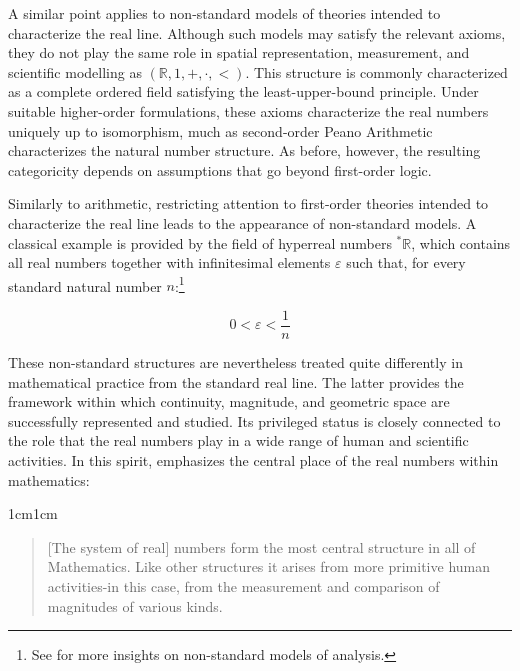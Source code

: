 \documentclass[11pt,a4paper]{book}
\theoremstyle{plain}
\begin{document}
A similar point applies to non-standard models of theories intended to characterize the real line. Although such models may satisfy the relevant axioms, they do not play the same role in spatial representation, measurement, and scientific modelling as $(\mathbb{R},1, +, \cdot, <)$. This structure is commonly characterized as a complete ordered field satisfying the least-upper-bound principle. Under suitable higher-order formulations, these axioms characterize the real numbers uniquely up to isomorphism, much as second-order Peano Arithmetic characterizes the natural number structure. As before, however, the resulting categoricity depends on assumptions that go beyond first-order logic.

Similarly to arithmetic, restricting attention to first-order theories intended to characterize the real line leads to the appearance of non-standard models. A classical example is provided by the field of hyperreal numbers $^*\mathbb{R}$, which contains all real numbers together with infinitesimal elements $\varepsilon$ such that, for every standard natural number $n$:\footnote{See \textcite{robinson1966nonstandard} for more insights on non-standard models of analysis.}

$$ 0 < \varepsilon < \frac{1}{n} $$

These non-standard structures are nevertheless treated quite differently in mathematical practice from the standard real line. The latter provides the framework within which continuity, magnitude, and geometric space are successfully represented and studied. Its privileged status is closely connected to the role that the real numbers play in a wide range of human and scientific activities. In this spirit, \textcite[93]{maclane1986mathematics} emphasizes the central place of the real numbers within mathematics:

\begin{adjustwidth}{1cm}{1cm}
\small
\begin{quote}
[The system of real] numbers form the most central structure in all of Mathematics. Like other structures it arises from more primitive human activities-in this case, from the measurement and comparison of magnitudes of various kinds.
\end{quote}
\end{adjustwidth}
\end{document}
